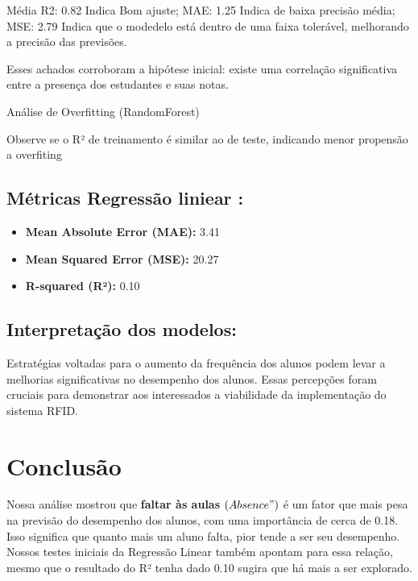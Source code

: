 \documentclass[
  letterpaper,
  DIV=11,
  numbers=noendperiod,
  openany]{scrreprt}
\providecommand{\tightlist}{%
  \setlength{\itemsep}{0pt}\setlength{\parskip}{0pt}}
\begin{document}
Média R2: 0.82 Indica Bom ajuste; MAE: 1.25 Indica de baixa precisão
média; MSE: 2.79 Indica que o modedelo está dentro de uma faixa
tolerável, melhorando a precisão das previsões.

Esses achados corroboram a hipótese inicial: existe uma correlação
significativa entre a presença dos estudantes e suas notas.

Análise de Overfitting (RandomForest)

Observe se o R² de treinamento é similar ao de teste, indicando menor
propensão a overfiting

\section{Métricas Regressão liniear
:}\label{muxe9tricas-regressuxe3o-liniear}

\begin{itemize}
\tightlist
\item
  \textbf{Mean Absolute Error (MAE):} 3.41
\item
  \textbf{Mean Squared Error (MSE):} 20.27
\item
  \textbf{R-squared (R²):} 0.10
\end{itemize}

\section{\texorpdfstring{\textbf{Interpretação dos
modelos:}}{Interpretação dos modelos:}}\label{interpretauxe7uxe3o-dos-modelos}

Estratégias voltadas para o aumento da frequência dos alunos podem levar
a melhorias significativas no desempenho dos alunos. Essas percepções
foram cruciais para demonstrar aos interessados a viabilidade da
implementação do sistema RFID.


\chapter{Conclusão}\label{conclusuxe3o}

Nossa análise mostrou que \textbf{faltar às aulas} \((Absence")\) é um
fator que mais pesa na previsão do desempenho dos alunos, com uma
importância de cerca de 0.18. Isso significa que quanto mais um aluno
falta, pior tende a ser seu desempenho. Nossos testes iniciais da
Regressão Linear também apontam para essa relação, mesmo que o resultado
do R² tenha dado 0.10 sugira que há mais a ser explorado.
\end{document}
